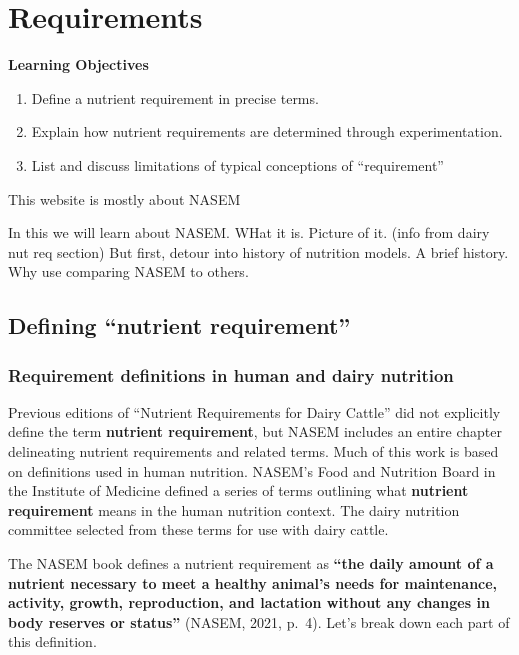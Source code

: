 \documentclass[
]{book}
\begin{document}
\hypertarget{requirements}{%
\chapter{Requirements}\label{requirements}}

\textbf{Learning Objectives}

\begin{enumerate}
\def\labelenumi{\arabic{enumi}.}
\item
  Define a nutrient requirement in precise terms.
\item
  Explain how nutrient requirements are determined through experimentation.
\item
  List and discuss limitations of typical conceptions of ``requirement''
\end{enumerate}

This website is mostly about NASEM

In this we will learn about NASEM. WHat it is. Picture of it. (info from dairy nut req section)
But first, detour into history of nutrition models.
A brief history.
Why use
comparing NASEM to others.

\hypertarget{defining-nutrient-requirement}{%
\section{Defining ``nutrient requirement''}\label{defining-nutrient-requirement}}

\hypertarget{requirement-definitions-in-human-and-dairy-nutrition}{%
\subsection{Requirement definitions in human and dairy nutrition}\label{requirement-definitions-in-human-and-dairy-nutrition}}

Previous editions of ``Nutrient Requirements for Dairy Cattle'' did not explicitly define the term \textbf{nutrient requirement}, but NASEM \citeyearpar{NASEM8} includes an entire chapter delineating nutrient requirements and related terms. Much of this work is based on definitions used in human nutrition. NASEM's Food and Nutrition Board in the Institute of Medicine \citep{iom2006} defined a series of terms outlining what \textbf{nutrient requirement} means in the human nutrition context. The dairy nutrition committee selected from these terms for use with dairy cattle.

The NASEM \citeyearpar{NASEM8} book defines a nutrient requirement as \textbf{``the daily amount of a nutrient necessary to meet a healthy animal's needs for maintenance, activity, growth, reproduction, and lactation without any changes in body reserves or status''} (NASEM, 2021, p.~4). Let's break down each part of this definition.
\end{document}
